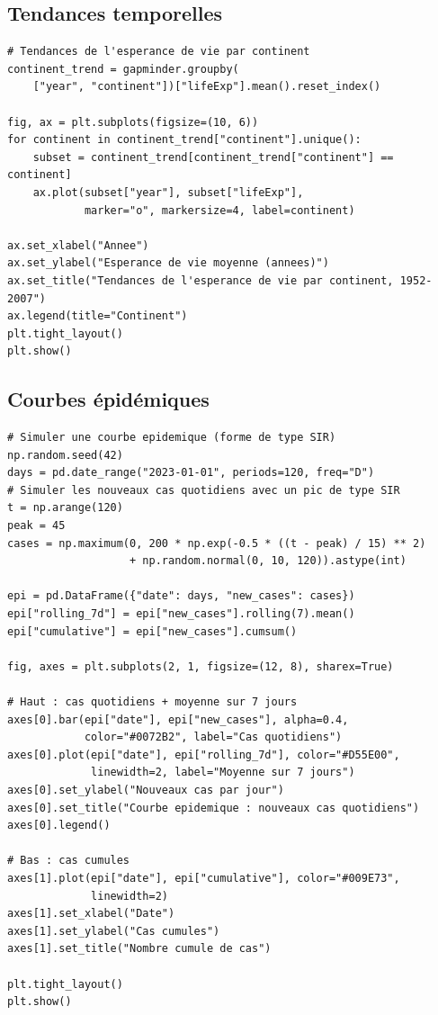 \subsection{Tendances temporelles}

\begin{verbatim}
# Tendances de l'esperance de vie par continent
continent_trend = gapminder.groupby(
    ["year", "continent"])["lifeExp"].mean().reset_index()

fig, ax = plt.subplots(figsize=(10, 6))
for continent in continent_trend["continent"].unique():
    subset = continent_trend[continent_trend["continent"] == continent]
    ax.plot(subset["year"], subset["lifeExp"],
            marker="o", markersize=4, label=continent)

ax.set_xlabel("Annee")
ax.set_ylabel("Esperance de vie moyenne (annees)")
ax.set_title("Tendances de l'esperance de vie par continent, 1952-2007")
ax.legend(title="Continent")
plt.tight_layout()
plt.show()
\end{verbatim}

\subsection{Courbes \'epid\'emiques}

\begin{verbatim}
# Simuler une courbe epidemique (forme de type SIR)
np.random.seed(42)
days = pd.date_range("2023-01-01", periods=120, freq="D")
# Simuler les nouveaux cas quotidiens avec un pic de type SIR
t = np.arange(120)
peak = 45
cases = np.maximum(0, 200 * np.exp(-0.5 * ((t - peak) / 15) ** 2)
                   + np.random.normal(0, 10, 120)).astype(int)

epi = pd.DataFrame({"date": days, "new_cases": cases})
epi["rolling_7d"] = epi["new_cases"].rolling(7).mean()
epi["cumulative"] = epi["new_cases"].cumsum()

fig, axes = plt.subplots(2, 1, figsize=(12, 8), sharex=True)

# Haut : cas quotidiens + moyenne sur 7 jours
axes[0].bar(epi["date"], epi["new_cases"], alpha=0.4,
            color="#0072B2", label="Cas quotidiens")
axes[0].plot(epi["date"], epi["rolling_7d"], color="#D55E00",
             linewidth=2, label="Moyenne sur 7 jours")
axes[0].set_ylabel("Nouveaux cas par jour")
axes[0].set_title("Courbe epidemique : nouveaux cas quotidiens")
axes[0].legend()

# Bas : cas cumules
axes[1].plot(epi["date"], epi["cumulative"], color="#009E73",
             linewidth=2)
axes[1].set_xlabel("Date")
axes[1].set_ylabel("Cas cumules")
axes[1].set_title("Nombre cumule de cas")

plt.tight_layout()
plt.show()
\end{verbatim}


